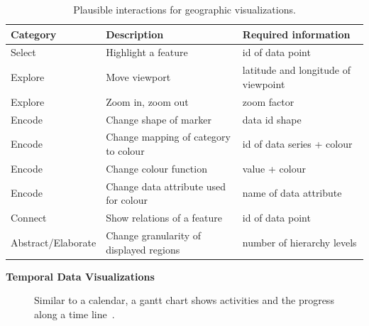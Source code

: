 \begin{table}[H]
  \caption{Plausible interactions for geographic visualizations.}%
  \label{tab:analysis:geographical:interactions}
  \begin{tabularx}{\linewidth}{lXX}
    \bf Category & \bf Description & \bf Required information \\
    \hline
    Select & Highlight a feature & id of data point \\
    Explore & Move viewport & latitude and longitude of viewpoint \\
    Explore & Zoom in, zoom out & zoom factor \\
    Encode & Change shape of marker & data id  shape \\
    Encode & Change mapping of category to colour & id of data series + colour \\
    Encode & Change colour function & value + colour \\
    Encode & Change data attribute used for colour & name of data attribute \\
    Connect & Show relations of a feature & id of data point  \\
    Abstract/Elaborate & Change granularity of displayed regions & number of hierarchy levels \\
  \end{tabularx}
\end{table}

\textbf{Temporal Data Visualizations}
\begin{figure}
  \centering
  \qquad
  \caption{Similar to a calendar, a gantt chart shows activities and the progress along a time line~\parencite{VisualizationCatalogue2017}.}%
  \label{fig:analysis:temporal}
\end{figure}

